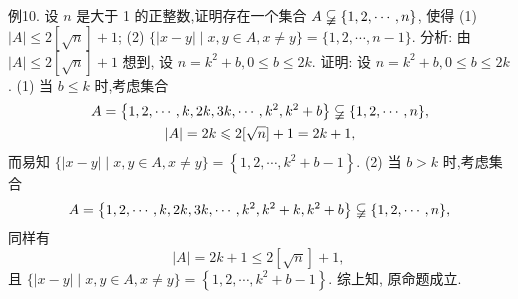 例10. 设 $n$ 是大于 1 的正整数,证明存在一个集合 $A \varsubsetneqq\{1,2, \cdots, n\}$, 使得
(1) $|A| \leqslant 2[\sqrt{n}]+1$;
(2) $\{|x-y| \mid x, y \in A, x \neq y\}=\{1,2, \cdots, n-1\}$.
分析: 由 $|A| \leqslant 2[\sqrt{n}]+1$ 想到, 设 $n=k^2+b, 0 \leqslant b \leqslant 2 k$.
证明: 设 $n=k^2+b, 0 \leqslant b \leqslant 2 k$.
(1) 当 $b \leqslant k$ 时,考虑集合
$$
\begin{gathered}
A=\left\{1,2, \cdots, k, 2 k, 3 k, \cdots, k^2, k^2+b\right\} \varsubsetneqq\{1,2, \cdots, n\}, \\
|A|=2 k \leqslant 2[\sqrt{n}]+1=2 k+1,
\end{gathered}
$$
而易知 $\{|x-y| \mid x, y \in A, x \neq y\}=\left\{1,2, \cdots, k^2+b-1\right\}$.
(2) 当 $b>k$ 时,考虑集合
$$
A=\left\{1,2, \cdots, k, 2 k, 3 k, \cdots, k^2, k^2+k, k^2+b\right\} \varsubsetneqq\{1,2, \cdots, n\},
$$
同样有
$$
|A|=2 k+1 \leqslant 2[\sqrt{n}]+1 \text {, }
$$
且 $\{|x-y| \mid x, y \in A, x \neq y\}=\left\{1,2, \cdots, k^2+b-1\right\}$.
综上知, 原命题成立.



